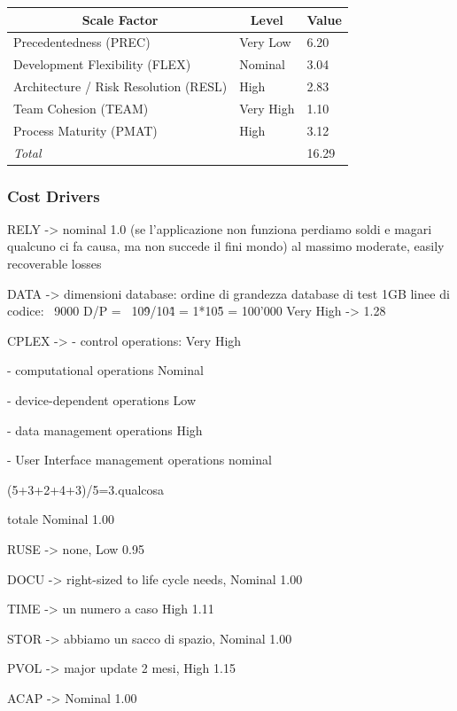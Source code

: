 \documentclass[english]{article}
\begin{document}
\begin{center}
	\begin{tabular}{|p{6cm}|p{2cm}|p{1cm}|}
		\hline
		\multicolumn{1}{|c|}{\textbf{Scale Factor}} & \multicolumn{1}{c}{\textbf{Level}} & \multicolumn{1}{|c|}{\textbf{Value}} \\
		\hline
		Precedentedness (PREC) & Very Low & 6.20 \\
		Development Flexibility (FLEX) & Nominal & 3.04 \\
		Architecture / Risk Resolution (RESL) & High & 2.83 \\
		Team Cohesion (TEAM) & Very High & 1.10 \\
		Process Maturity (PMAT) & High & 3.12 \\
		\hline
		\multicolumn{2}{|l|}{\textit{Total}} & 16.29 \\
		\hline
	\end{tabular}
\end{center}

\subsubsection{Cost Drivers}

RELY -> nominal 1.0 (se l'applicazione non funziona perdiamo soldi e magari qualcuno ci fa causa, ma non succede il fini mondo) al massimo moderate, easily recoverable losses

DATA ->  
dimensioni database: ordine di grandezza database di test 1GB %
linee di codice: ~9000
D/P = ~10\^9/10\^4 = 1*10\^5 = 100'000
Very High -> 1.28

CPLEX ->
- control operations:
Very High

- computational operations
Nominal

- device-dependent operations
Low

- data management operations
High

- User Interface management operations
nominal

(5+3+2+4+3)/5=3.qualcosa

totale Nominal 1.00

RUSE -> none, Low 0.95

DOCU -> right-sized to life cycle needs, Nominal 1.00

TIME -> un numero a caso High 1.11

STOR -> abbiamo un sacco di spazio, Nominal 1.00

PVOL -> major update 2 mesi, High 1.15

ACAP -> Nominal 1.00
\end{document}
